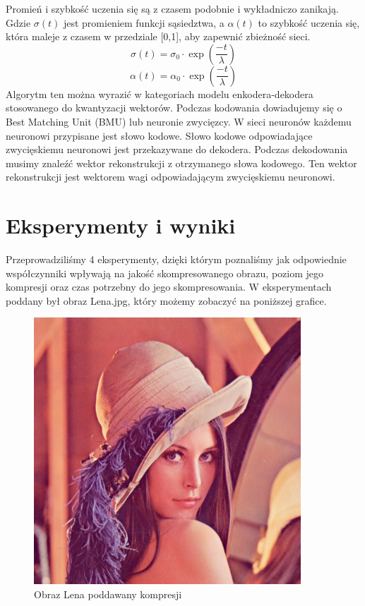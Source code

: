 \documentclass[12pt]{article}
\begin{document}
Promień i szybkość uczenia się są z czasem podobnie i wykładniczo zanikają. Gdzie $ \sigma(t) $ jest promieniem funkcji sąsiedztwa, a $ \alpha(t) $   to szybkość uczenia się, która maleje z czasem w przedziale [0,1], aby zapewnić zbieżność sieci.
\begin{equation}
\sigma (t)=\sigma_0 \cdot \exp\left(\frac{-t}{\lambda }\right)
\end{equation}
\begin{equation}
\alpha  (t)=\alpha_0 \cdot \exp\left(\frac{-t}{\lambda }\right)
\end{equation}
Algorytm ten można wyrazić w kategoriach modelu enkodera-dekodera stosowanego do kwantyzacji wektorów. Podczas kodowania dowiadujemy się o Best Matching Unit (BMU) lub neuronie zwycięzcy. W sieci neuronów każdemu neuronowi przypisane jest słowo kodowe. Słowo kodowe odpowiadające zwycięskiemu neuronowi jest przekazywane do dekodera. Podczas dekodowania musimy znaleźć wektor rekonstrukcji z otrzymanego słowa kodowego. Ten wektor rekonstrukcji jest wektorem wagi odpowiadającym zwycięskiemu neuronowi.
\section{Eksperymenty i wyniki}

Przeprowadziliśmy 4 eksperymenty, dzięki którym poznaliśmy jak odpowiednie współczynniki wpływają na jakość skompresowanego obrazu, poziom jego kompresji oraz czas potrzebny do jego skompresowania. W eksperymentach poddany był obraz Lena.jpg, który możemy zobaczyć na poniższej grafice.

\begin{figure}[h!]
 \centering
 
 \includegraphics[width=10cm]{Lenna.png}
 \vspace{-0.3cm}
 \caption{Obraz Lena poddawany kompresji}
 \vspace*{\floatsep}


\end{figure}
\clearpage
\end{document}
